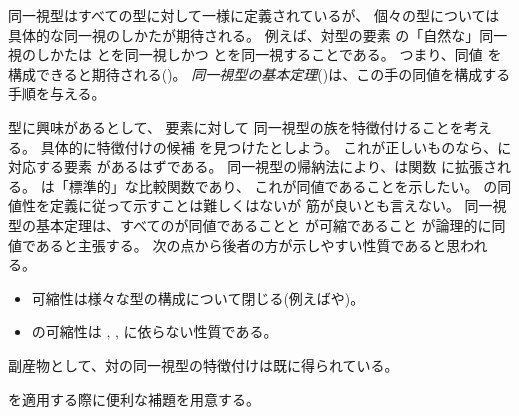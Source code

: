 \documentclass[index]{subfiles}
\begin{document}

同一視型はすべての型に対して一様に定義されているが、
個々の型については具体的な同一視のしかたが期待される。
例えば、対型の要素
の「自然な」同一視のしかたは
とを同一視しかつ
とを同一視することである。
つまり、同値
を構成できると期待される()。
\emph{同一視型の基本定理}()は、この手の同値を構成する手順を与える。

型に興味があるとして、
要素に対して
同一視型の族を特徴付けることを考える。
具体的に特徴付けの候補
を見つけたとしよう。
これが正しいものなら、に対応する要素
があるはずである。
同一視型の帰納法により、は関数
に拡張される。
は「標準的」な比較関数であり、
これが同値であることを示したい。
の同値性を定義に従って示すことは難しくはないが
筋が良いとも言えない。
同一視型の基本定理は、すべてのが同値であることと
が可縮であること
が論理的に同値であると主張する。
次の点から後者の方が示しやすい性質であると思われる。
\begin{itemize}
\item 可縮性は様々な型の構成について閉じる(例えばや)。
\item {}の可縮性は
  , , に依らない性質である。
\end{itemize}






副産物として、対の同一視型の特徴付けは既に得られている。



を適用する際に便利な補題を用意する。





\end{document}
